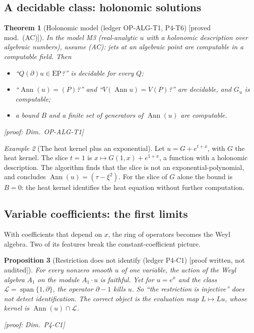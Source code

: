\documentclass[11pt]{article}
\theoremstyle{plain}
\newtheorem{theorem}{Theorem}[section]
\newtheorem{proposition}[theorem]{Proposition}
\theoremstyle{definition}
\theoremstyle{remark}
\newtheorem{example}[theorem]{Example}
\DeclareMathOperator{\Ann}{Ann}             %
\DeclareMathOperator{\spn}{span}
\newcommand{\Var}{V}                        %
\newcommand{\EP}{\mathrm{EP}}               %
\newcommand{\badge}[2]{\textcolor{#1}{\textsf{\footnotesize[#2]}}}
\newcommand{\modulo}[1]{\badge{cD}{proved mod.\ #1}}
\newcommand{\led}[1]{\textcolor{cG}{\textsf{\footnotesize(ledger #1)}}}
\newcommand{\dimref}[1]{\textsf{\footnotesize[proof: Dim.~#1]}}
\newcommand{\pw}{\badge{cD}{proof written, not audited}}
\begin{document}
\subsection{A decidable class: holonomic solutions}

\begin{theorem}[{Holonomic model \led{OP-ALG-T1, P4-T6} \modulo{(AC)}}]\label{thm:holo}
In the model M3 (real-analytic $u$ with a holonomic description over algebraic numbers), assume (AC): jets at an algebraic point are computable in a computable field. Then
\begin{itemize}
\item ``$Q(\partial)u\in\EP$?'' is decidable for every $Q$;
\item ``$\Ann(u)=(P)$?'' and ``$\Var(\Ann u)=\Var(P)$?'' are decidable, and $G_u$ is computable;
\item a bound $B$ and a finite set of generators of $\Ann(u)$ are computable.
\end{itemize}
\dimref{OP-ALG-T1}
\end{theorem}

\begin{example}[{The heat kernel plus an exponential}]
Let $u=G+e^{t+x}$, with $G$ the heat kernel. The slice $t=1$ is $x\mapsto G(1,x)+e^{1+x}$, a function with a holonomic description. The algorithm finds that the slice is not an exponential-polynomial, and concludes $\Ann(u)=(\tau-\xi^2)$. For the slice of $G$ alone the bound is $B=0$: the heat kernel identifies the heat equation without further computation.
\end{example}

\subsection{Variable coefficients: the first limits}

With coefficients that depend on $x$, the ring of operators becomes the Weyl algebra. Two of its features break the constant-coefficient picture.

\begin{proposition}[{Restriction does not identify \led{P4-C1} \pw}]\label{prop:weyl}
For every nonzero smooth $u$ of one variable, the action of the Weyl algebra $A_1$ on the module $A_1\cdot u$ is faithful. Yet for $u=e^x$ and the class $\mathcal L=\spn\{1,\partial\}$, the operator $\partial-1$ kills $u$. So ``the restriction is injective'' does not detect identification. The correct object is the evaluation map $L\mapsto Lu$, whose kernel is $\Ann(u)\cap\mathcal L$.

\dimref{P4-C1}
\end{proposition}
\end{document}
